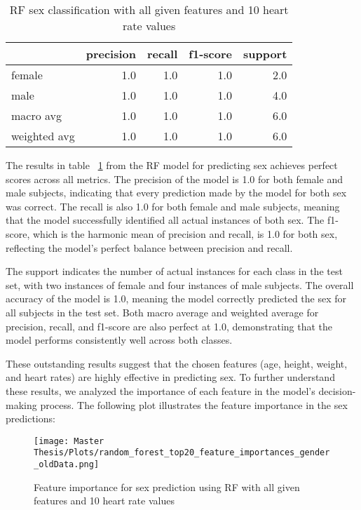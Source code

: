 \begin{table}[H]
\centering
\begin{tabular}{lrrrr}
\toprule
{} &  precision &  recall &  f1-score &  support \\
\midrule
female       &        1.0 &     1.0 &       1.0 &      2.0 \\
male         &        1.0 &     1.0 &       1.0 &      4.0 \\
macro avg    &        1.0 &     1.0 &       1.0 &      6.0 \\
weighted avg &        1.0 &     1.0 &       1.0 &      6.0 \\
\bottomrule
\end{tabular}
\caption{RF sex classification with all given features and 10 heart rate values}
\label{table:RFageHeartrate10weightheigt}
\end{table}

The results in table ~\ref{table:RFageHeartrate10weightheigt} from the RF model for predicting sex achieves perfect scores across all metrics. The precision of the model is 1.0 for both female and male subjects, indicating that every prediction made by the model for both sex was correct. The recall is also 1.0 for both female and male subjects, meaning that the model successfully identified all actual instances of both sex. The f1-score, which is the harmonic mean of precision and recall, is 1.0 for both sex, reflecting the model's perfect balance between precision and recall.

The support indicates the number of actual instances for each class in the test set, with two instances of female and four instances of male subjects. The overall accuracy of the model is 1.0, meaning the model correctly predicted the sex for all subjects in the test set. Both macro average and weighted average for precision, recall, and f1-score are also perfect at 1.0, demonstrating that the model performs consistently well across both classes.

These outstanding results suggest that the chosen features (age, height, weight, and heart rates) are highly effective in predicting sex. To further understand these results, we analyzed the importance of each feature in the model's decision-making process. The following plot illustrates the feature importance in the sex predictions:

\FloatBarrier
\begin{figure}[h!]
    \centering
    \texttt{[image: Master Thesis/Plots/random\_forest\_top20\_feature\_importances\_gender\_oldData.png]}
    \caption{Feature importance for sex prediction using RF with all given features and 10 heart rate values}
    \label{fig:featureimportanceRFsex10}
\end{figure}
\FloatBarrier

